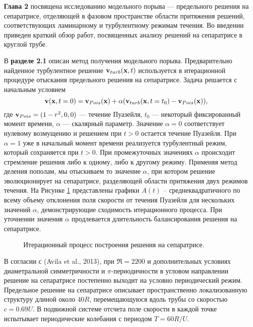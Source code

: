 \textbf{Глава 2} посвящена исследованию модельного порыва --- предельного решения на сепаратрисе, отделяющей в фазовом пространстве области притяжения решений, соответствующих ламинарному и турбулентному режимам течения. Во введении приведен краткий обзор работ, посвященных анализу решений на сепаратрисе в круглой трубе. 

В \textbf{разделе 2.1} описан метод получения модельного порыва. Предварительно найденное турбулентное решение $\mathbf{v}_{turb}(\mathbf{x},t)$ используется в итерационной процедуре отыскания предельного решения на сепаратрисе. Задача решается с начальным условием
\begin{equation} \label{edge_init_eq}
\mathbf{v}(\mathbf{x},t=0) = \mathbf{v}_{Pois}(\mathbf{x})+\alpha(\mathbf{v}_{turb}(\mathbf{x},t=t_0) - \mathbf{v}_{Pois}(\mathbf{x})),
\end{equation}
где $\mathbf{v}_{Pois}=(1-r^2,0,0)$ --- течение Пуазейля, $t_0$ --- некоторый фиксированный момент времени, $\alpha$ --- скалярный параметр. Значение $\alpha=0$ соответствует нулевому возмущению и решением при $t > 0$ остается течение Пуазейля. При $\alpha=1$ уже в начальный момент времени реализуется турбулентный режим, который сохраняется при $t > 0$. При промежуточных значениях $\alpha$ происходит стремление решения либо к одному, либо к другому режиму. Применяя метод деления пополам, мы отыскиваем то значение $\alpha$, при котором решение эволюционирует на сепаратрисе, разделяющей области притяжения двух режимов течения. На Рисунке \ref{bisection_pic} представлены графики $A(t)$ – среднеквадратичного по всему объему отклонения поля скорости от течения Пуазейля для нескольких значений $\alpha$, демонстрирующие сходимость итерационного процесса. При уточнении значения $\alpha$ продлевается длительность балансирования решения на сепаратрисе.

\begin{figure}
\caption{Итерационный процесс построения решения на сепаратрисе.}
\label{bisection_pic}
\end{figure}

В согласии с (Avila et al., 2013), при $\Re=2200$ и дополнительных условиях диаметральной симметричности и $\pi$-периодичности в угловом направлении решение на сепаратрисе постепенно выходит на условно периодический режим. Предельное решение на сепаратрисе описывает пространственно локализованную структуру длиной около $40R$, перемещающуюся вдоль трубы со скоростью $c=0.69U$. В подвижной системе отсчета поле скорости в каждой точке испытывает периодические колебания с периодом $T=60R/U$. 

